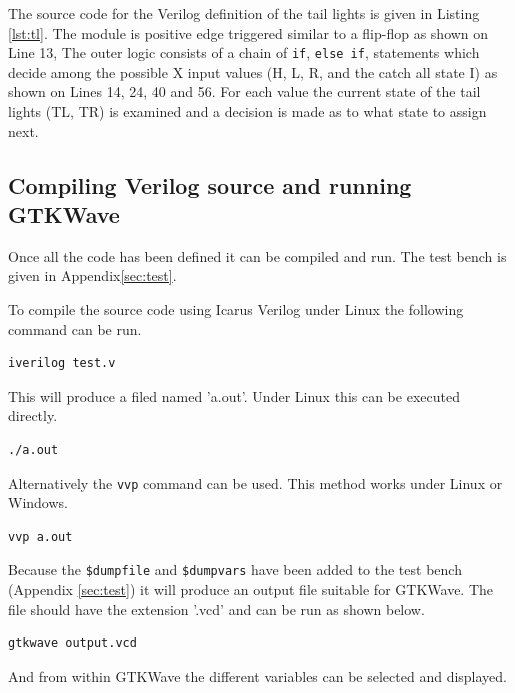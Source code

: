 \documentclass[12pt]{article}
\begin{document}
The source code for the Verilog definition of the tail lights
is given in Listing \ref{lst:tl}.
The module is positive edge triggered similar to a flip-flop
as shown on Line 13,
The outer logic consists of a chain of \verb+if+, \verb+else if+,
statements which decide among the possible X input values (H, L, R, and
the catch all state I) as shown on Lines 14, 24, 40 and 56.
For each value the current state of the tail lights (TL, TR) is examined
and a decision is made as to what state to assign next.




\subsection{Compiling Verilog source and running GTKWave}

Once all the code has been defined it can be compiled and run.
The test bench is given in Appendix\ref{sec:test}.

To compile the source code using Icarus Verilog\cite{VERILOG}
under Linux the following command can be run.

\begin{verbatim}
iverilog test.v
\end{verbatim}

This will produce a filed named 'a.out'.
Under Linux this can be executed directly.

\begin{verbatim}
./a.out
\end{verbatim}

Alternatively the \verb+vvp+ command can be used.
This method works under Linux or Windows.

\begin{verbatim}
vvp a.out
\end{verbatim}

Because the \verb+$dumpfile+ and \verb+$dumpvars+ have been
added to the test bench (Appendix \ref{sec:test})
it will produce an output file suitable for GTKWave\cite{GTKWAVE}.
The file should have the extension '.vcd' and can
be run as shown below.

\begin{verbatim}
gtkwave output.vcd
\end{verbatim}

And from within GTKWave the different variables can be selected
and displayed.
\end{document}
